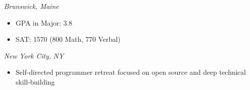 {\hfill \textit{Brunswick, Maine}}
\begin{itemize}[leftmargin=*, itemsep=0pt, parsep=0pt, topsep=0pt]
    \item GPA in Major: 3.8
    \item SAT: 1570 (800 Math, 770 Verbal)
\end{itemize}
\vspace{0.5em}

{\hfill \textit{New York City, NY}}
\begin{itemize}[leftmargin=*, itemsep=0pt, parsep=0pt, topsep=0pt]
    \item Self-directed programmer retreat focused on open source and deep technical skill-building
\end{itemize}
\vspace{0.5em}


